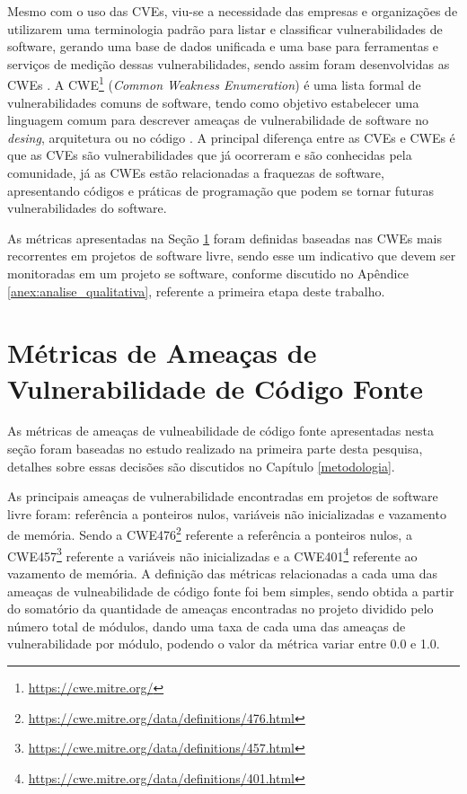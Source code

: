 Mesmo com o uso das CVEs, viu-se a necessidade das empresas e organizações de
utilizarem uma terminologia padrão para listar e classificar vulnerabilidades de
software, gerando uma base de dados unificada e uma base para ferramentas e
serviços de medição dessas vulnerabilidades, sendo assim foram desenvolvidas as
CWEs \cite{arthur&carlos2014}. A CWE\footnote{\url{https://cwe.mitre.org/}}
(\textit{Common Weakness Enumeration}) é uma lista formal de vulnerabilidades
comuns de software, tendo como objetivo estabelecer uma linguagem comum para
descrever ameaças de vulnerabilidade de software no \textit{desing}, arquitetura
ou no código \cite{arthur&carlos2014}.  A principal diferença entre as CVEs e
CWEs é que as CVEs são vulnerabilidades que já ocorreram e são conhecidas pela
comunidade, já as CWEs estão relacionadas a fraquezas de software, apresentando
códigos e práticas de programação que podem se tornar futuras vulnerabilidades
do software.

As métricas apresentadas na Seção \ref{metricasvulnerabilidade} foram definidas
baseadas nas CWEs mais recorrentes em projetos de software livre, sendo esse um
indicativo que devem ser monitoradas em um projeto se software, conforme
discutido no Apêndice \ref{anex:analise_qualitativa}, referente a primeira etapa
deste trabalho.

\section{Métricas de Ameaças de Vulnerabilidade de Código Fonte}\label{metricasvulnerabilidade}

As métricas de ameaças de vulneabilidade de código fonte apresentadas nesta
seção foram baseadas no estudo realizado na primeira parte desta pesquisa,
detalhes sobre essas decisões são discutidos no Capítulo \ref{metodologia}.

As principais ameaças de vulnerabilidade encontradas em projetos de software
livre foram: referência a ponteiros nulos, variáveis não inicializadas e
vazamento de memória. Sendo a
CWE476\footnote{\url{https://cwe.mitre.org/data/definitions/476.html}} referente
a referência a ponteiros nulos, a
CWE457\footnote{\url{https://cwe.mitre.org/data/definitions/457.html}} referente
a variáveis não inicializadas e a
CWE401\footnote{\url{https://cwe.mitre.org/data/definitions/401.html}} referente
ao vazamento de memória. A definição das métricas relacionadas a cada uma das
ameaças de vulneabilidade de código fonte foi bem simples, sendo obtida a partir
do somatório da quantidade de ameaças encontradas no projeto dividido pelo
número total de módulos, dando uma taxa de cada uma das ameaças de
vulnerabilidade por módulo, podendo o valor da métrica variar entre 0.0 e 1.0.

